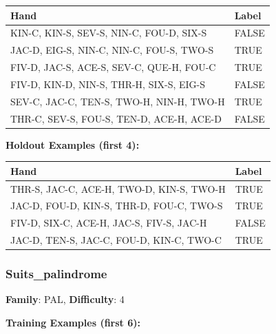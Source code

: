 \documentclass[10pt,a4paper]{article}
\begin{document}
\begin{small}
\begin{tabular}{p{8cm}l}
\toprule
Hand & Label \\
\midrule
KIN-C, KIN-S, SEV-S, NIN-C, FOU-D, SIX-S & \textcolor{negative}{FALSE} \\
JAC-D, EIG-S, NIN-C, NIN-C, FOU-S, TWO-S & \textcolor{positive}{TRUE} \\
FIV-D, JAC-S, ACE-S, SEV-C, QUE-H, FOU-C & \textcolor{positive}{TRUE} \\
FIV-D, KIN-D, NIN-S, THR-H, SIX-S, EIG-S & \textcolor{negative}{FALSE} \\
SEV-C, JAC-C, TEN-S, TWO-H, NIN-H, TWO-H & \textcolor{positive}{TRUE} \\
THR-C, SEV-S, FOU-S, TEN-D, ACE-H, ACE-D & \textcolor{negative}{FALSE} \\
\bottomrule
\end{tabular}
\end{small}

\textbf{Holdout Examples (first 4):}

\begin{small}
\begin{tabular}{p{8cm}l}
\toprule
Hand & Label \\
\midrule
THR-S, JAC-C, ACE-H, TWO-D, KIN-S, TWO-H & \textcolor{positive}{TRUE} \\
JAC-D, FOU-D, KIN-S, THR-D, FOU-C, TWO-S & \textcolor{positive}{TRUE} \\
FIV-D, SIX-C, ACE-H, JAC-S, FIV-S, JAC-H & \textcolor{negative}{FALSE} \\
JAC-D, TEN-S, JAC-C, FOU-D, KIN-C, TWO-C & \textcolor{positive}{TRUE} \\
\bottomrule
\end{tabular}
\end{small}

\vspace{0.5cm}

\subsubsection{Suits\_palindrome}

\textbf{Family}: PAL, \textbf{Difficulty}: 4

\textbf{Training Examples (first 6):}
\end{document}
